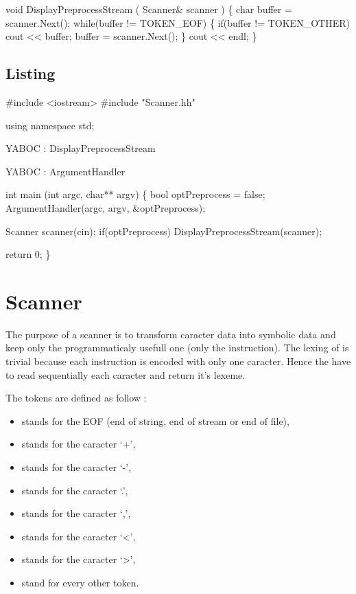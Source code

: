 \nwenddocs{}\endmoddef\nwstartdeflinemarkup\nwenddeflinemarkup
void DisplayPreprocessStream ( Scanner& scanner ) \{
        char buffer = scanner.Next();
        while(buffer != TOKEN_EOF) \{
                if(buffer != TOKEN_OTHER) cout << buffer;
                buffer = scanner.Next();
        \}
        cout << endl;
\}
\nwendcode{}\nwdocspar

\subsection{Listing}
\nwenddocs{}\endmoddef\nwstartdeflinemarkup\nwenddeflinemarkup
#include <iostream>
#include "Scanner.hh"

using namespace std;

\LA{}YABOC : DisplayPreprocessStream\RA{}

\LA{}YABOC : ArgumentHandler\RA{}

int main (int argc, char** argv) \{
        bool optPreprocess = false;
        ArgumentHandler(argc, argv, &optPreprocess);    

        Scanner scanner(cin);
        if(optPreprocess) DisplayPreprocessStream(scanner);

        return 0;
\}
\nwendcode{}\nwdocspar

\nwenddocs{}\endmoddef\nwstartdeflinemarkup\nwenddeflinemarkup
\nwendcode{}\nwdocspar
\nwenddocs{}\section{Scanner}
The purpose of a scanner is to transform caracter data into symbolic data and keep only the programmaticaly usefull one (\ie only the instruction). The lexing of \brainfuck is trivial because each instruction is encoded with only one caracter. Hence the  have to read sequentially each caracter and return it's \gls{lexeme}.

The tokens are defined as follow :
\begin{itemize}
        \item {} stands for the EOF (\ie end of string, end of stream or end of file),

        \item {} stands for the caracter `+',
        \item {} stands for the caracter `-',
        \item {} stands for the caracter `.',
        \item {} stands for the caracter `,',
        \item {} stands for the caracter `<',
        \item {} stands for the caracter `>',

        \item {} stand for every other token.
\end{itemize}


